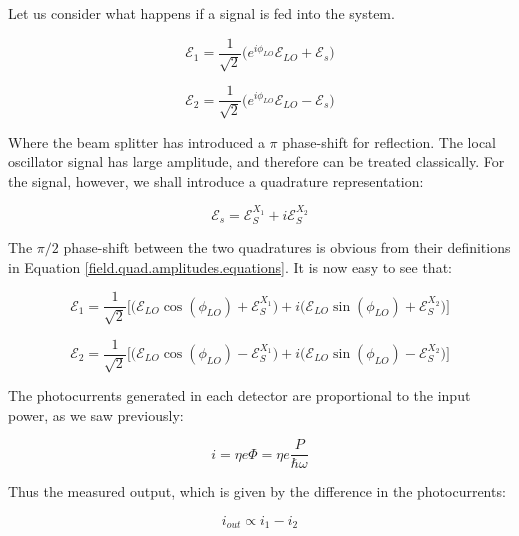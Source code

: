 \documentclass[12pt,a4paper]{report}
\begin{document}
Let us consider what happens if a signal is fed into the system.

\begin{equation}
    \mathcal{E}_1=\frac{1}{\sqrt{2}}\big(e^{i\phi_{LO}}\mathcal{E}_{LO}+\mathcal{E}_{s}\big)
\end{equation}

\begin{equation}
    \mathcal{E}_2=\frac{1}{\sqrt{2}}\big(e^{i\phi_{LO}}\mathcal{E}_{LO}-\mathcal{E}_{s}\big)
\end{equation}

Where the beam splitter has introduced a $\pi$ phase-shift for reflection. The local oscillator signal has large amplitude, and therefore can be treated classically. For the signal, however, we shall introduce a quadrature representation:

\begin{equation}
    \mathcal{E}_s=\mathcal{E}_S^{X_1}+i\mathcal{E}_S^{X_2}
\end{equation}

The $\pi/2$ phase-shift between the two quadratures is obvious from their definitions in Equation \ref{field.quad.amplitudes.equations}. It is now easy to see that:

\begin{equation}
    \mathcal{E}_1=\frac{1}{\sqrt{2}}\Big[   \big(\mathcal{E}_{LO}\cos(\phi_{LO})+\mathcal{E}_S^{X_1}\big)  +i\big(\mathcal{E}_{LO}\sin(\phi_{LO})+\mathcal{E}_S^{X_2}\big)\Big]
\end{equation}

\begin{equation}
    \mathcal{E}_2=\frac{1}{\sqrt{2}}\Big[   \big(\mathcal{E}_{LO}\cos(\phi_{LO})-\mathcal{E}_S^{X_1}\big)  +i\big(\mathcal{E}_{LO}\sin(\phi_{LO})-\mathcal{E}_S^{X_2}\big)\Big]
\end{equation}

The photocurrents generated in each detector are proportional to the input power, as we saw previously:

\begin{equation}
    i=\eta e \Phi=\eta e \frac{P}{\hbar\omega}
\end{equation}

Thus the measured output, which is given by the difference in the photocurrents:

\begin{equation}
    i_{out}\propto i_1-i_2
\end{equation}
\end{document}
